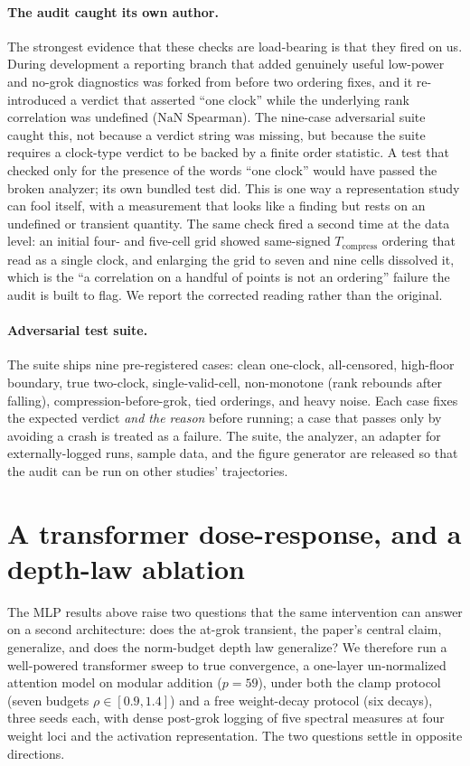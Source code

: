 \documentclass[11pt]{article}
\begin{document}
\paragraph{The audit caught its own author.} The strongest evidence that these checks are load-bearing is that they fired on us. During development
a reporting branch that added genuinely useful low-power and no-grok diagnostics was forked from before
two ordering fixes, and it re-introduced a verdict that asserted ``one clock'' while the underlying rank
correlation was undefined ($\mathrm{NaN}$ Spearman). The nine-case adversarial suite caught this, not
because a verdict string was missing, but because the suite requires a clock-type verdict to be backed by
a finite order statistic. A test that checked only for the presence of the words ``one clock'' would have
passed the broken analyzer; its own bundled test did. This is one way a representation study can fool
itself, with a measurement that looks like a finding but rests on an undefined or transient quantity. The
same check fired a second time at the data level: an initial four- and five-cell grid showed same-signed
$T_{\mathrm{compress}}$ ordering that read as a single clock, and enlarging the grid to seven and nine
cells dissolved it, which is the ``a correlation on a handful of points is not an ordering'' failure the
audit is built to flag. We report the corrected reading rather than the original.

\paragraph{Adversarial test suite.} The suite ships nine pre-registered cases: clean one-clock,
all-censored, high-floor boundary, true two-clock, single-valid-cell, non-monotone (rank rebounds after
falling), compression-before-grok, tied orderings, and heavy noise. Each case fixes the expected verdict
\emph{and the reason} before running; a case that passes only by avoiding a crash is treated as a
failure. The suite, the analyzer, an adapter for externally-logged runs, sample data, and the figure
generator are released so that the audit can be run on other studies' trajectories.

\section{A transformer dose-response, and a depth-law ablation}
\label{sec:transformer}
The MLP results above raise two questions that the same intervention can answer on a second
architecture: does the at-grok transient, the paper's central claim, generalize, and does the norm-budget
depth law generalize? We therefore run a well-powered transformer sweep to true convergence, a one-layer
un-normalized attention model on modular addition ($p=59$), under both the clamp protocol (seven budgets
$\rho\in[0.9,1.4]$) and a free weight-decay protocol (six decays), three seeds each, with dense post-grok
logging of five spectral measures at four weight loci and the activation representation. The two
questions settle in opposite directions.
\end{document}
